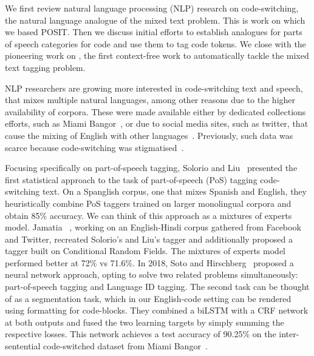 We first review natural language processing (NLP) research on code-switching,
the natural language analogue of the mixed text problem.  This is work on which
we based POSIT.  Then we discuss initial efforts to establish analogues for
parts of speech categories for code and use them to tag code tokens.  We close
with the pioneering work on \stormed, the first context-free work to
automatically tackle the mixed text tagging problem.

NLP researchers are growing more interested in code-switching text and speech,
\ie that mixes multiple natural languages, among other reasons due to the higher
availability of corpora. These were made available either by dedicated
collections efforts, such as Miami Bangor~\cite{bangorTalk}, or due to social
media sites, such as twitter, that cause the mixing of English with other
languages~\cite{Vyas2014}. Previously, such data was scarce because
code-switching was stigmatised~\cite{Poplack1980}. 

Focusing specifically on part-of-speech tagging, Solorio and
Liu~\cite{Solorio2008} presented the first statistical approach to the task of
part-of-speech (PoS) tagging code-switching text. On a Spanglish corpus, one
that mixes Spanish and English, they heuristically combine PoS taggers trained
on larger monolingual corpora and obtain 85\% accuracy. We can think of this
approach as a mixtures of experts model. Jamatia \etal~\cite{Jamatia2015},
working on an English-Hindi corpus gathered from Facebook and Twitter, recreated
Solorio's and Liu's tagger and additionally proposed a tagger built on
Conditional Random Fields. The mixtures of experts model performed better at
72\% vs 71.6\%. In 2018, Soto and Hirschberg~\cite{Soto2018} proposed a neural
network approach, opting to solve two related problems simultaneously:
part-of-speech tagging and Language ID tagging. The second task can be thought
of as a segmentation task, which in our English-code setting can be rendered
using formatting for code-blocks. They combined a biLSTM with a CRF network at
both outputs and fused the two learning targets by simply summing the respective
losses. This network achieves a test accuracy of 90.25\% on the inter-sentential
code-switched dataset from Miami Bangor~\cite{bangorTalk}.

